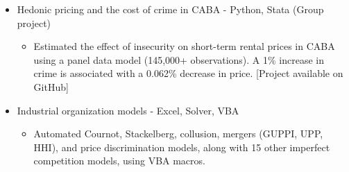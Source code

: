 \documentclass[11pt, a4paper]{article}
\begin{document}
\begin{itemize}[label=\small$\bullet$, leftmargin=1.4em, itemsep=5pt]
\color{darktext}
    \item {\large Hedonic pricing and the cost of crime in CABA - Python, Stata (Group project)}
     \begin{itemize}[label=\tiny$\bullet$]
        \item {\large \color{subtext} Estimated the effect of insecurity on short-term rental prices in CABA using a panel data model (145,000+ observations). A 1\% increase in crime is associated with a 0.062\% decrease in price. {\color{linecolor} [Project available on GitHub]}}
    \end{itemize}
    
    \item {\large Industrial organization models - Excel, Solver, VBA}
     \begin{itemize}[label=\tiny$\bullet$]
        \item {\large \color{subtext} Automated Cournot, Stackelberg, collusion, mergers (GUPPI, UPP, HHI), and price discrimination models, along with 15 other imperfect competition models, using VBA macros.}
    \end{itemize}
    
\end{itemize}
\end{document}
